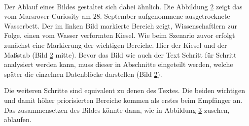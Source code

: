\begin{figure}[H]
	\centering
	\hfill
	\\
	\label{fig:marsWaterResidue}
\end{figure}

Der Ablauf eines Bildes gestaltet sich dabei ähnlich. Die Abbildung
\ref{fig:marsWaterResidue} zeigt das vom Marsrover \glqq Curiosity \grqq
am $28.$ September aufgenommene ausgetrocknete Wasserbett. Der im linken
Bild markierte Bereich zeigt, Wissenschaftlern zur Folge, einen vom Wasser
verformten Kiesel. Wie beim Szenario zuvor erfolgt zunächst eine Markierung der wichtigen
Bereiche. Hier der Kiesel und der Maßstab (Bild \ref{fig:marsWaterResidue}
mitte). Bevor das Bild wie auch der Text Schritt für Schritt analysiert werden
kann, muss dieser in Abschnitte eingeteilt werden, welche später die einzelnen
Datenblöcke darstellen (Bild \ref{fig:marsWaterResidue}).
 
\begin{figure}[H]
	\centering
	\hfill
	\hfill
	\label{fig:marsWaterResidue}
\end{figure}

Die weiteren Schritte sind equivalent zu denen des Textes. Die beiden wichtigen
und damit höher priorisierten Bereiche kommen als erstes beim Empfänger an. Das
zusammensetzen des Bildes könnte dann, wie in Abbildung
\ref{fig:marsWaterResidueEmpfaenger} zusehen, ablaufen.

\begin{figure}[H]
	\centering
	\hfill
	\hfill
	\label{fig:marsWaterResidueEmpfaenger}
\end{figure}